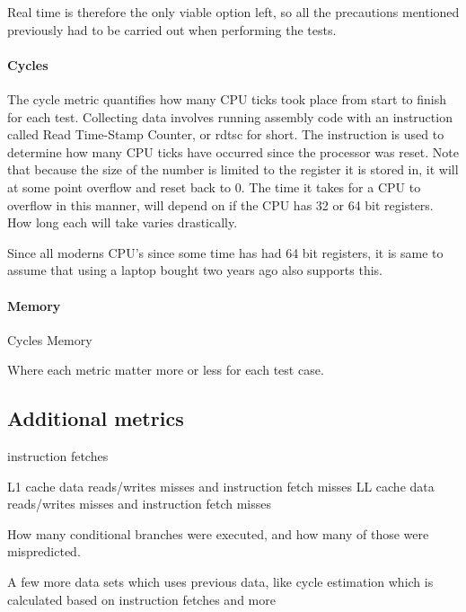 Real time is therefore the only viable option left, so all the precautions mentioned previously had to be carried out when performing the tests.

\paragraph{Cycles}
The cycle metric quantifies how many CPU ticks took place from start to finish for each test.
Collecting data involves running assembly code with an instruction called Read Time-Stamp Counter, or rdtsc for short.
The instruction is used to determine how many CPU ticks have occurred since the processor was reset.
Note that because the size of the number is limited to the register it is stored in, it will at some point overflow and reset back to 0.
The time it takes for a CPU to overflow in this manner, will depend on if the CPU has 32 or 64 bit registers.
How long each will take varies drastically.



Since all moderns CPU's since  some time has had 64 bit registers, it is same to assume that using a laptop bought two years ago also supports this.

\paragraph{Memory}

Cycles
Memory

Where each metric matter more or less for each test case.


\subsection{Additional metrics}

instruction fetches

L1 cache data reads/writes misses and instruction fetch misses
LL cache data reads/writes misses and instruction fetch misses

How many conditional branches were executed, and how many of those were mispredicted.

A few more data sets which uses previous data, like cycle estimation which is calculated based on instruction fetches and more
